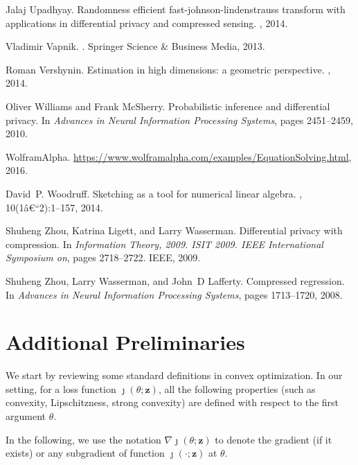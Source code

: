 \documentclass{article}
\theoremstyle{plain}
\def \z {\mathbf z}
\begin{document}
\begin{thebibliography}{10}
Jalaj Upadhyay.
\newblock Randomness efficient fast-johnson-lindenstrauss transform with
  applications in differential privacy and compressed sensing.
, 2014.

Vladimir Vapnik.
.
\newblock Springer Science \& Business Media, 2013.

Roman Vershynin.
\newblock Estimation in high dimensions: a geometric perspective.
, 2014.

Oliver Williams and Frank McSherry.
\newblock Probabilistic inference and differential privacy.
\newblock In {\em Advances in Neural Information Processing Systems}, pages
  2451--2459, 2010.

WolframAlpha.
\newblock \url{https://www.wolframalpha.com/examples/EquationSolving.html},
  2016.

David~P. Woodruff.
\newblock Sketching as a tool for numerical linear algebra.
,
  10(1â€“2):1--157, 2014.

Shuheng Zhou, Katrina Ligett, and Larry Wasserman.
\newblock Differential privacy with compression.
\newblock In {\em Information Theory, 2009. ISIT 2009. IEEE International
  Symposium on}, pages 2718--2722. IEEE, 2009.

Shuheng Zhou, Larry Wasserman, and John~D Lafferty.
\newblock Compressed regression.
\newblock In {\em Advances in Neural Information Processing Systems}, pages
  1713--1720, 2008.

\end{thebibliography}

\appendix

\section{Additional Preliminaries} \label{app:convex}
We start by reviewing some standard definitions in convex optimization. In our setting, for a loss function $\jmath(\theta;\z)$, all the following properties (such as convexity, Lipschitzness, strong convexity) are defined with respect to the first argument $\theta$.

In the following, we use the notation $\nabla \jmath(\theta;\z)$ to denote the gradient (if it exists) or any subgradient of function $\jmath(\cdot;\z)$ at $\theta$. 
\end{document}
